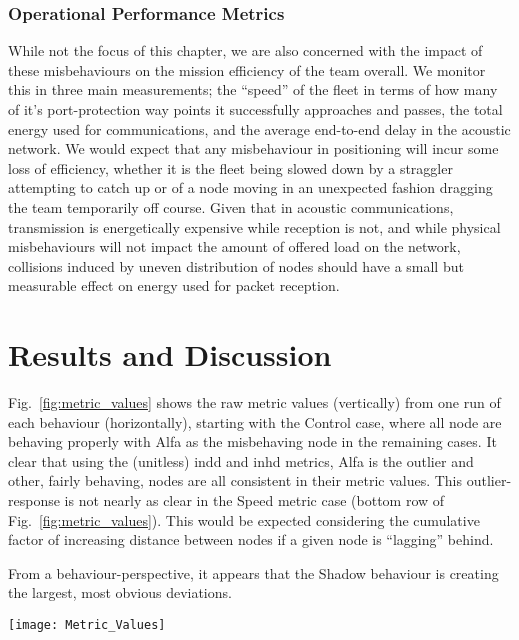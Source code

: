 \subsubsection{Operational Performance Metrics}
While not the focus of this chapter, we are also concerned with the impact of these misbehaviours on the mission efficiency of the team overall.
We monitor this in three main measurements; the ``speed'' of the fleet in terms of how many of it's port-protection way points it successfully approaches and passes, the total energy used for communications, and the average end-to-end delay in the acoustic network.
We would expect that any misbehaviour in positioning will incur some loss of efficiency, whether it is the fleet being slowed down by a straggler attempting to catch up or of a node moving in an unexpected fashion dragging the team temporarily off course.
Given that in acoustic communications, transmission is energetically expensive while reception is not, and while physical misbehaviours will not impact the amount of offered load on the network, collisions induced by uneven distribution of nodes should have a small but measurable effect on energy used for packet reception.

\section{Results and Discussion}
Fig.~\ref{fig:metric_values} shows the raw metric values (vertically) from one run of each behaviour (horizontally), starting with the Control case, where all node are behaving properly with Alfa as the misbehaving node in the remaining cases.
It clear that using the (unitless) \gls{indd} and \gls{inhd} metrics, Alfa is the outlier and other, fairly behaving, nodes are all consistent in their metric values.
This outlier-response is not nearly as clear in the Speed metric case (bottom row of Fig.~\ref{fig:metric_values}).
This would be expected considering the cumulative factor of increasing distance between nodes if a given node is ``lagging'' behind.

From a behaviour-perspective, it appears that the Shadow behaviour is creating the largest, most obvious deviations.

\begin{figure*}
  \centering
  \texttt{[image: Metric\_Values]}
  \caption[Observed Metric Values for one simulation of each behaviour]{Observed Metric Values for one simulation of each behaviour ($x_{i,j}^{m,t}$ from \autoref{eq:d})}
  \label{fig:metric_values}
\end{figure*}

